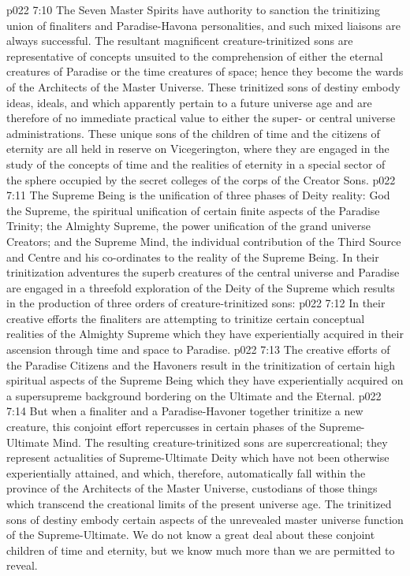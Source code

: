 \vs p022 7:10 \pc The Seven Master Spirits have authority to sanction the trinitizing union of finaliters and Paradise\hyp{}Havona personalities, and such mixed liaisons are always successful. The resultant magnificent creature\hyp{}trinitized sons are representative of concepts unsuited to the comprehension of either the eternal creatures of Paradise or the time creatures of space; hence they become the wards of the Architects of the Master Universe. These trinitized sons of destiny embody ideas, ideals, and  which apparently pertain to a future universe age and are therefore of no immediate practical value to either the super\hyp{} or central universe administrations. These unique sons of the children of time and the citizens of eternity are all held in reserve on Vicegerington, where they are engaged in the study of the concepts of time and the realities of eternity in a special sector of the sphere occupied by the secret colleges of the corps of the Creator Sons.
\vs p022 7:11 \pc The Supreme Being is the unification of three phases of Deity reality: God the Supreme, the spiritual unification of certain finite aspects of the Paradise Trinity; the Almighty Supreme, the power unification of the grand universe Creators; and the Supreme Mind, the individual contribution of the Third Source and Centre and his co\hyp{}ordinates to the reality of the Supreme Being. In their trinitization adventures the superb creatures of the central universe and Paradise are engaged in a threefold exploration of the Deity of the Supreme which results in the production of three orders of creature\hyp{}trinitized sons:
\vs p022 7:12 \bibnobreakspace {} In their creative efforts the finaliters are attempting to trinitize certain conceptual realities of the Almighty Supreme which they have experientially acquired in their ascension through time and space to Paradise.
\vs p022 7:13 \bibnobreakspace {} The creative efforts of the Paradise Citizens and the Havoners result in the trinitization of certain high spiritual aspects of the Supreme Being which they have experientially acquired on a supersupreme background bordering on the Ultimate and the Eternal.
\vs p022 7:14 \bibnobreakspace {} But when a finaliter and a Paradise\hyp{}Havoner together trinitize a new creature, this conjoint effort repercusses in certain phases of the Supreme\hyp{}Ultimate Mind. The resulting creature\hyp{}trinitized sons are supercreational; they represent actualities of Supreme\hyp{}Ultimate Deity which have not been otherwise experientially attained, and which, therefore, automatically fall within the province of the Architects of the Master Universe, custodians of those things which transcend the creational limits of the present universe age. The trinitized sons of destiny embody certain aspects of the unrevealed master universe function of the Supreme\hyp{}Ultimate. We do not know a great deal about these conjoint children of time and eternity, but we know much more than we are permitted to reveal.
